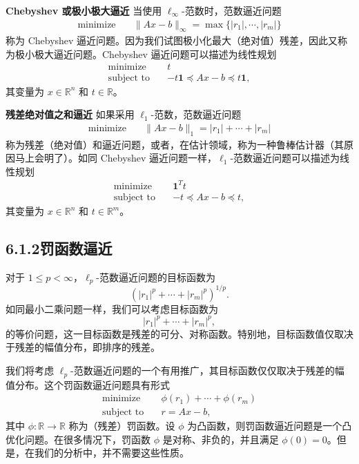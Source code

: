 \documentclass[UTF8,12pt,a4paper,fontset=fandol]{ctexart}
\begin{document}
\noindent\textbf{Chebyshev 或极小极大逼近}\quad
当使用 $\ell_\infty$-范数时，范数逼近问题
\[
\begin{aligned}
\text{minimize}\quad & \|Ax-b\|_\infty=\max\{|r_1|,\cdots,|r_m|\}
\end{aligned}
\]
称为 Chebyshev 逼近问题。因为我们试图极小化最大（绝对值）残差，因此又称为极小极大逼近问题。Chebyshev 逼近问题可以描述为线性规划
\[
\begin{aligned}
\text{minimize}\quad & t\\
\text{subject to}\quad & -t\mathbf{1}\preceq Ax-b\preceq t\mathbf{1},
\end{aligned}
\]
其变量为 $x\in\mathbb{R}^n$ 和 $t\in\mathbb{R}$。

\noindent\textbf{残差绝对值之和逼近}\quad
如果采用 $\ell_1$-范数，范数逼近问题
\[
\begin{aligned}
\text{minimize}\quad & \|Ax-b\|_1=|r_1|+\cdots+|r_m|
\end{aligned}
\]
称为残差（绝对值）和逼近问题，或者，在估计领域，称为一种鲁棒估计器（其原因马上会明了）。如同 Chebyshev 逼近问题一样，$\ell_1$-范数逼近问题可以描述为线性规划
\[
\begin{aligned}
\text{minimize}\quad & \mathbf{1}^Tt\\
\text{subject to}\quad & -t\preceq Ax-b\preceq t,
\end{aligned}
\]
其变量为 $x\in\mathbb{R}^n$ 和 $t\in\mathbb{R}^m$。

\subsection*{6.1.2\quad 罚函数逼近}

对于 $1\leq p<\infty$，$\ell_p$-范数逼近问题的目标函数为
\[
\left(|r_1|^p+\cdots+|r_m|^p\right)^{1/p}.
\]
如同最小二乘问题一样，我们可以考虑目标函数为
\[
|r_1|^p+\cdots+|r_m|^p,
\]
的等价问题，这一目标函数是残差的可分、对称函数。特别地，目标函数值仅取决于残差的幅值分布，即排序的残差。

我们将考虑 $\ell_p$-范数逼近问题的一个有用推广，其目标函数仅仅取决于残差的幅值分布。这个罚函数逼近问题具有形式
\begin{equation}
\begin{aligned}
\text{minimize}\quad & \phi(r_1)+\cdots+\phi(r_m)\\
\text{subject to}\quad & r=Ax-b,
\end{aligned}
\tag{6.2}
\end{equation}
其中 $\phi:\mathbb{R}\to\mathbb{R}$ 称为（残差）罚函数。设 $\phi$ 为凸函数，则罚函数逼近问题是一个凸优化问题。在很多情况下，罚函数 $\phi$ 是对称、非负的，并且满足 $\phi(0)=0$。但是，在我们的分析中，并不需要这些性质。
\end{document}
